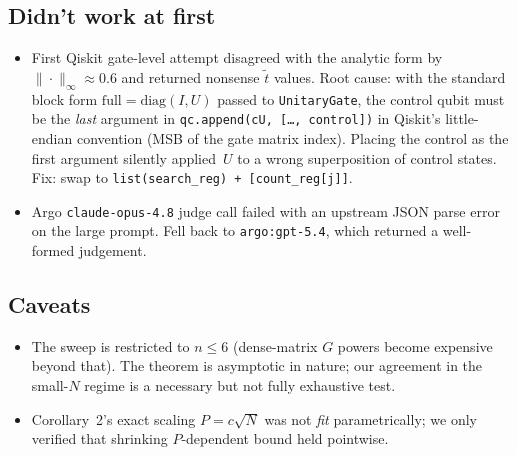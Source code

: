 \documentclass[11pt]{article}
\begin{document}
\subsection*{Didn't work at first}
\begin{itemize}
  \item First Qiskit gate-level attempt disagreed with the analytic form by
        $\|\cdot\|_\infty \approx 0.6$ and returned nonsense $\tilde t$ values.
        Root cause: with the standard block form $\mathrm{full}=\mathrm{diag}(I,U)$
        passed to \texttt{UnitaryGate}, the control qubit must be the
        \emph{last} argument in \texttt{qc.append(cU, [\dots, control])} in
        Qiskit's little-endian convention (MSB of the gate matrix index).
        Placing the control as the first argument silently applied~$U$ to a
        wrong superposition of control states. Fix: swap to
        \texttt{list(search\_reg) + [count\_reg[j]]}.
  \item Argo \texttt{claude-opus-4.8} judge call failed with an upstream JSON
        parse error on the large prompt. Fell back to \texttt{argo:gpt-5.4},
        which returned a well-formed judgement.
\end{itemize}
\subsection*{Caveats}
\begin{itemize}
  \item The sweep is restricted to $n\le 6$ (dense-matrix $G$ powers become
        expensive beyond that). The theorem is asymptotic in nature; our
        agreement in the small-$N$ regime is a necessary but not fully
        exhaustive test.
  \item Corollary~2's exact scaling $P=c\sqrt N$ was not \emph{fit}
        parametrically; we only verified that shrinking $P$-dependent bound
        held pointwise.
\end{itemize}
\end{document}
